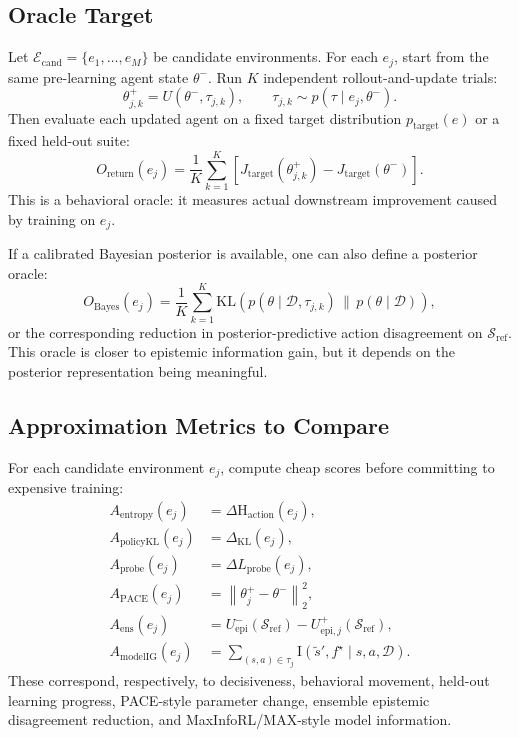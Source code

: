 \documentclass[11pt]{article}
\newcommand{\D}{\mathcal{D}}
\newcommand{\Sref}{\mathcal{S}_{\mathrm{ref}}}
\newcommand{\KL}{\mathrm{KL}}
\newcommand{\Hent}{\mathrm{H}}
\newcommand{\I}{\mathrm{I}}
\begin{document}
\subsection{Oracle Target}

Let $\mathcal{E}_{\mathrm{cand}}=\{e_1,\ldots,e_M\}$ be candidate environments.
For each $e_j$, start from the same pre-learning agent state $\theta^-$. Run
$K$ independent rollout-and-update trials:
\begin{equation}
  \theta_{j,k}^+
  =
  U(\theta^-, \tau_{j,k}),
  \qquad
  \tau_{j,k} \sim p(\tau \mid e_j,\theta^-).
\end{equation}
Then evaluate each updated agent on a fixed target distribution
$p_{\mathrm{target}}(e)$ or a fixed held-out suite:
\begin{equation}
  O_{\mathrm{return}}(e_j)
  =
  \frac{1}{K}\sum_{k=1}^{K}
  \left[
    J_{\mathrm{target}}(\theta_{j,k}^+)
    -
    J_{\mathrm{target}}(\theta^-)
  \right].
\end{equation}
This is a behavioral oracle: it measures actual downstream improvement caused by
training on $e_j$.

If a calibrated Bayesian posterior is available, one can also define a posterior
oracle:
\begin{equation}
  O_{\mathrm{Bayes}}(e_j)
  =
  \frac{1}{K}\sum_{k=1}^{K}
  \KL\left(
    p(\theta \mid \D,\tau_{j,k})
    \,\|\,
    p(\theta \mid \D)
  \right),
\end{equation}
or the corresponding reduction in posterior-predictive action disagreement on
$\Sref$. This oracle is closer to epistemic information gain, but it depends on
the posterior representation being meaningful.

\subsection{Approximation Metrics to Compare}

For each candidate environment $e_j$, compute cheap scores before committing to
expensive training:
\begin{align}
  A_{\mathrm{entropy}}(e_j)
  &=
  \Delta \Hent_{\mathrm{action}}(e_j),
  \\
  A_{\mathrm{policyKL}}(e_j)
  &=
  \Delta_{\mathrm{KL}}(e_j),
  \\
  A_{\mathrm{probe}}(e_j)
  &=
  \Delta L_{\mathrm{probe}}(e_j),
  \\
  A_{\mathrm{PACE}}(e_j)
  &=
  \left\lVert \theta_j^+ - \theta^- \right\rVert_2^2,
  \\
  A_{\mathrm{ens}}(e_j)
  &=
  U_{\mathrm{epi}}^-(\Sref)
  -
  U_{\mathrm{epi},j}^+(\Sref),
  \\
  A_{\mathrm{modelIG}}(e_j)
  &=
  \sum_{(s,a)\in \tau_j}
  \I(\tilde{s}', f^\star \mid s,a,\D).
\end{align}
These correspond, respectively, to decisiveness, behavioral movement,
held-out learning progress, PACE-style parameter change, ensemble epistemic
disagreement reduction, and MaxInfoRL/MAX-style model information.
\end{document}
